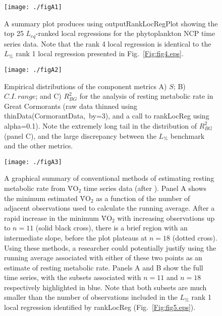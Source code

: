\documentclass[11pt]{article}
\newcommand{\code}{\fontfamily{pcr}\selectfont}
\begin{document}
\renewcommand{\thefigure}{A\arabic{figure}}
\setcounter{figure}{0}

\begin{figure}[!ht]
\texttt{[image: ./figA1]}
\caption{A summary plot produces using {\code outputRankLocRegPlot} showing the top 25 $L_{eq}$-ranked local regressions for the phytoplankton NCP time series data. Note that the rank 4 local regression is identical to the $L_\%$ rank 1 local regression presented in Fig.~\ref{Fig:fig4.eps}.}
\label{FigA:figA1.eps}
\end{figure}
\newpage{}

\begin{figure}[!ht]
\texttt{[image: ./figA2]}
\caption{Empirical distributions of the component metrics A) $S$; B) $C.I.~range$; and C) $R^2_{BG}$ for the analysis of resting metabolic rate in Great Cormorants (raw data thinned using {\code thinData(CormorantData,~by=3)}, and a call to {\code rankLocReg} using {\code alpha=0.1}). Note the extremely long tail in the distribution of $R^2_{BG}$ (panel C), and the large discrepancy between the $L_\%$ benchmark and the other metrics.}
\label{FigA:figA2.eps}
\end{figure}
\newpage{}


\begin{figure}[!ht]
\texttt{[image: ./figA3]}
\caption{A graphical summary of conventional methods of estimating resting metabolic rate from \.VO$_2$ time series data (after \citealt{Withers2001}). Panel A shows the minimum estimated \.VO$_2$ as a function of the number of adjacent observations used to calculate the running average. After a rapid increase in the minimum \.VO$_2$ with increasing observations up to $n = 11$ (solid black cross), there is a brief region with an intermediate slope, before the plot plateaus at $n = 18$ (dotted cross). Using these methods, a researcher could potentially justify using the running average associated with either of these two points as an estimate of resting metabolic rate. Panels A and B show the full time series, with the subsets associated with $n = 11$ and $n = 18$ respectively highlighted in blue. Note that both subsets are much smaller than the number of observations included in the $L_\%$ rank 1 local regression identified by {\code rankLocReg} (Fig.~\ref{Fig:fig5.eps}).}
\label{FigA:figA3.eps}
\end{figure}
\end{document}
